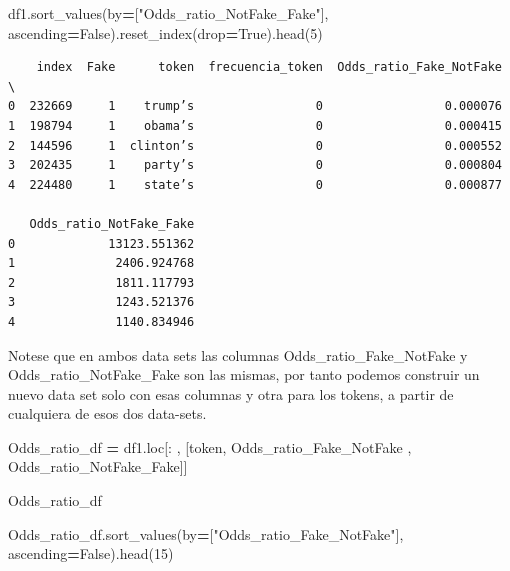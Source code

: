 \documentclass[
  11pt,
  a4paper,
]{article}
\newenvironment{Shaded}{\begin{snugshade}}{\end{snugshade}}
\newcommand{\DecValTok}[1]{\textcolor[rgb]{0.00,0.00,0.81}{#1}}
\newcommand{\NormalTok}[1]{#1}
\newcommand{\OperatorTok}[1]{\textcolor[rgb]{0.81,0.36,0.00}{\textbf{#1}}}
\newcommand{\StringTok}[1]{\textcolor[rgb]{0.31,0.60,0.02}{#1}}
\newcommand{\VariableTok}[1]{\textcolor[rgb]{0.00,0.00,0.00}{#1}}
\begin{document}
\begin{Shaded}
\begin{Highlighting}[]
\NormalTok{df1.sort\_values(by}\OperatorTok{=}\NormalTok{[}\StringTok{"Odds\_ratio\_NotFake\_Fake"}\NormalTok{], ascending}\OperatorTok{=}\VariableTok{False}\NormalTok{).reset\_index(drop}\OperatorTok{=}\VariableTok{True}\NormalTok{).head(}\DecValTok{5}\NormalTok{)}
\end{Highlighting}
\end{Shaded}

\begin{verbatim}
    index  Fake      token  frecuencia_token  Odds_ratio_Fake_NotFake  \
0  232669     1    trump’s                 0                 0.000076   
1  198794     1    obama’s                 0                 0.000415   
2  144596     1  clinton’s                 0                 0.000552   
3  202435     1    party’s                 0                 0.000804   
4  224480     1    state’s                 0                 0.000877   

   Odds_ratio_NotFake_Fake  
0             13123.551362  
1              2406.924768  
2              1811.117793  
3              1243.521376  
4              1140.834946 
\end{verbatim}

Notese que en ambos data sets las columnas Odds\_ratio\_Fake\_NotFake y
Odds\_ratio\_NotFake\_Fake son las mismas, por tanto podemos construir
un nuevo data set solo con esas columnas y otra para los tokens, a
partir de cualquiera de esos dos data-sets.

\begin{Shaded}
\begin{Highlighting}[]
\NormalTok{Odds\_ratio\_df }\OperatorTok{=}\NormalTok{ df1.loc[: , [}\StringTok{\textquotesingle{}token\textquotesingle{}}\NormalTok{, }\StringTok{\textquotesingle{}Odds\_ratio\_Fake\_NotFake\textquotesingle{}}\NormalTok{ , }\StringTok{\textquotesingle{}Odds\_ratio\_NotFake\_Fake\textquotesingle{}}\NormalTok{]]  }

\NormalTok{Odds\_ratio\_df}
\end{Highlighting}
\end{Shaded}

\begin{Shaded}
\begin{Highlighting}[]
\NormalTok{Odds\_ratio\_df.sort\_values(by}\OperatorTok{=}\NormalTok{[}\StringTok{"Odds\_ratio\_Fake\_NotFake"}\NormalTok{], ascending}\OperatorTok{=}\VariableTok{False}\NormalTok{).head(}\DecValTok{15}\NormalTok{)}
\end{Highlighting}
\end{Shaded}
\end{document}
